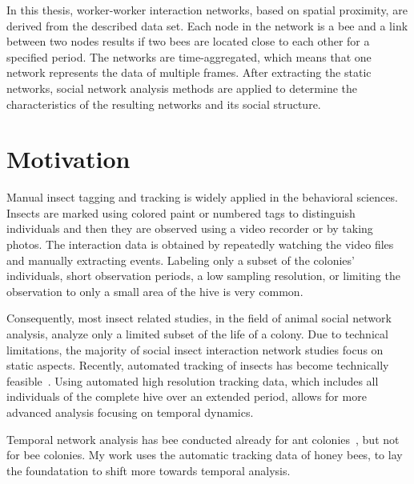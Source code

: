In this thesis, worker-worker interaction networks, based on spatial proximity, are derived from the described data set. Each node in the network is a bee and a link between two nodes results if two bees are located close to each other for a specified period.
The networks are time-aggregated, which means that one network represents the data of multiple frames.
After extracting the static networks, social network analysis methods are applied to determine the characteristics of the resulting networks and its social structure.

\section{Motivation}
\label{sec:intro:motivation}
Manual insect tagging and tracking is widely applied in the behavioral sciences.
Insects are marked using colored paint or numbered tags to distinguish individuals and then they are observed using a video recorder or by taking photos.
The interaction data is obtained by repeatedly watching the video files and manually extracting events.
Labeling only a subset of the colonies' individuals, short observation periods, a low sampling resolution, or limiting the observation to only a small area of the hive is very common.

Consequently, most insect related studies, in the field of animal social network analysis, analyze only a limited subset of the life of a colony.
Due to technical limitations, the majority of social insect interaction network
studies focus on static aspects.
Recently, automated tracking of insects has become technically feasible~\cite{wario2015automatic, crall2015beetag, fiala2005comparing}.
Using automated high resolution tracking data, which includes all individuals of the complete hive over an extended period, allows for more advanced analysis focusing on temporal dynamics.

Temporal network analysis has bee conducted already for ant colonies~\cite{mersch2013tracking}, but not for bee colonies.
My work uses the automatic tracking data of honey bees, to lay the foundatation to shift more towards temporal analysis.

